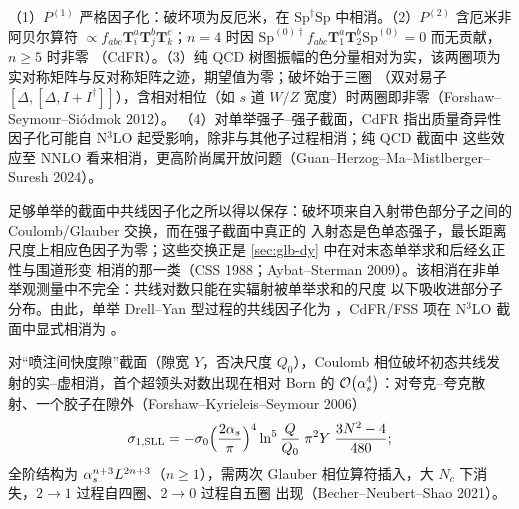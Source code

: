 \begin{proposition}\label{prop:glb-sl2}
（1）$P^{(1)}$ 严格因子化：破坏项为反厄米，在 $\mathrm{Sp}^\dagger\mathrm{Sp}$ 中相消。（2）$P^{(2)}$ 含厄米非阿贝尔算符
$\propto f_{abc}\bm T_i^a\bm T_j^b\bm T_k^c$；$n=4$ 时因 $\mathrm{Sp}^{(0)\dagger}f_{abc}\bm T_1^a\bm T_2^b\mathrm{Sp}^{(0)}=0$ 而无贡献，$n\ge5$ 时非零
（CdFR）。（3）纯 QCD 树图振幅的色分量相对为实，该两圈项为实对称矩阵与反对称矩阵之迹，期望值为零；破坏始于三圈
（双对易子 $[\Delta,[\Delta,I+I^\dagger]]$），含相对相位（如 $s$ 道 $W/Z$ 宽度）时两圈即非零（Forshaw--Seymour--Siódmok 2012）。
（4）对单举强子–强子截面，CdFR 指出质量奇异性因子化可能自 N$^3$LO 起受影响，除非与其他子过程相消；纯 QCD 截面中
这些效应至 NNLO 看来相消，更高阶尚属开放问题（Guan--Herzog--Ma--Mistlberger--Suresh 2024）。
\end{proposition}

足够单举的截面中共线因子化之所以得以保存：破坏项来自入射带色部分子之间的 Coulomb/Glauber 交换，而在强子截面中真正的
入射态是色单态强子，最长距离尺度上相应色因子为零；这些交换正是 \cref{sec:glb-dy} 中在对末态单举求和后经幺正性与围道形变
相消的那一类（CSS 1988；Aybat--Sterman 2009）。该相消在非单举观测量中不完全：共线对数只能在实辐射被单举求和的尺度
以下吸收进部分子分布。由此，单举 Drell--Yan 型过程的共线因子化为 \tagA，CdFR/FSS 项在 N$^3$LO 截面中显式相消为 \tagC。

\begin{proposition}\label{prop:glb-sll}
对“喷注间快度隙”截面（隙宽 $Y$，否决尺度 $Q_0$），Coulomb 相位破坏初态共线发射的实–虚相消，首个超领头对数出现在相对
Born 的 $\mathcal{O}\!\left(\alpha_s^4\right)$：对夸克–夸克散射、一个胶子在隙外（Forshaw--Kyrieleis--Seymour 2006）
\begin{equation}\label{eq:glb-sll}
\sigma_{1,\rm SLL}=-\sigma_0\Big(\frac{2\alpha_s}{\pi}\Big)^4\ln^5\frac{Q}{Q_0}\;\pi^2Y\;\frac{3N^2-4}{480};
\end{equation}
全阶结构为 $\alpha_s^{n+3}L^{2n+3}$（$n\ge1$），需两次 Glauber 相位算符插入，大 $N_c$ 下消失，$2\to1$ 过程自四圈、$2\to0$ 过程自五圈
出现（Becher--Neubert--Shao 2021）。
\end{proposition}
